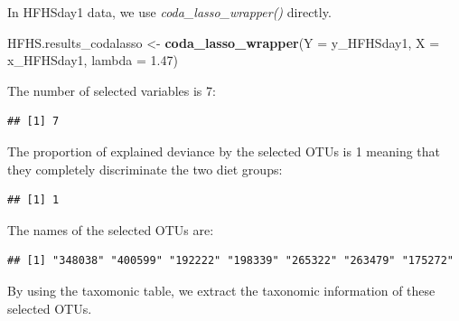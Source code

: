 \documentclass[openany]{book}
\newenvironment{Shaded}{\begin{snugshade}}{\end{snugshade}}
\newcommand{\KeywordTok}[1]{\textcolor[rgb]{0.13,0.29,0.53}{\textbf{#1}}}
\newcommand{\DataTypeTok}[1]{\textcolor[rgb]{0.13,0.29,0.53}{#1}}
\newcommand{\FloatTok}[1]{\textcolor[rgb]{0.00,0.00,0.81}{#1}}
\newcommand{\StringTok}[1]{\textcolor[rgb]{0.31,0.60,0.02}{#1}}
\newcommand{\OperatorTok}[1]{\textcolor[rgb]{0.81,0.36,0.00}{\textbf{#1}}}
\newcommand{\NormalTok}[1]{#1}
\begin{document}
In HFHSday1 data, we use \emph{coda\_lasso\_wrapper()} directly.

\begin{Shaded}
\begin{Highlighting}[]
\NormalTok{HFHS.results_codalasso <-}\StringTok{ }\KeywordTok{coda_lasso_wrapper}\NormalTok{(}\DataTypeTok{Y =}\NormalTok{ y_HFHSday1, }\DataTypeTok{X =}\NormalTok{ x_HFHSday1, }\DataTypeTok{lambda =} \FloatTok{1.47}\NormalTok{) }
\end{Highlighting}
\end{Shaded}

The number of selected variables is 7:

\begin{Shaded}
\end{Shaded}

\begin{verbatim}
## [1] 7
\end{verbatim}

The proportion of explained deviance by the selected OTUs is 1 meaning
that they completely discriminate the two diet groups:

\begin{Shaded}
\end{Shaded}

\begin{verbatim}
## [1] 1
\end{verbatim}

The names of the selected OTUs are:

\begin{Shaded}
\end{Shaded}

\begin{verbatim}
## [1] "348038" "400599" "192222" "198339" "265322" "263479" "175272"
\end{verbatim}

By using the taxomonic table, we extract the taxonomic information of
these selected OTUs.
\end{document}
